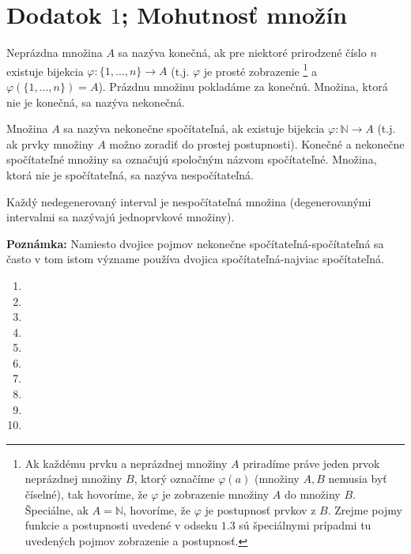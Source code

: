 \chapter{Dodatok $1$; Mohutnosť množín}

Neprázdna množina $A$ sa nazýva konečná, ak pre niektoré prirodzené číslo $n$ existuje bijekcia $\varphi:\{1,...,n\}\rightarrow A$ (t.j. $\varphi$ je prosté zobrazenie \footnote{Ak každému prvku a neprázdnej množiny $A$ priradíme práve jeden prvok neprázdnej množiny $B$, ktorý označíme $\varphi (a)$ (množiny $A,B$ nemusia byť číselné), tak hovoríme, že $\varphi$ je zobrazenie množiny $A$ do množiny $B$. Špeciálne, ak $A=\mathbb{N}$, hovoríme, že $\varphi$ je postupnosť prvkov z $B$. Zrejme pojmy funkcie a postupnosti uvedené v odseku $1.3$ sú špeciálnymi prípadmi tu uvedených pojmov zobrazenie a postupnosť.} a $\varphi(\{1,...,n\})=A$). Prázdnu množinu pokladáme za konečnú. Množina, ktorá nie je konečná, sa nazýva nekonečná.

Množina $A$ sa nazýva nekonečne spočítateľná, ak existuje bijekcia $\varphi:\mathbb{N}\rightarrow A$ (t.j. ak prvky množiny $A$ možno zoradiť do prostej postupnosti). Konečné a nekonečne spočítateľné množiny sa označujú spoločným názvom spočítateľné. Množina, ktorá nie je spočítateľná, sa nazýva nespočítateľná.

\begin{veta}
Každý nedegenerovaný interval je nespočítateľná množina (degenerovanými intervalmi sa nazývajú jednoprvkové množiny).
\end{veta}

\textbf{Poznámka:} Namiesto dvojice pojmov nekonečne spočítateľná-spočítateľná sa často v tom istom význame používa dvojica spočítateľná-najviac spočítateľná.

\begin{enumerate}[resume]
  \item {}
  \item {}
  \item {}
  \item {}
  \item {}
  \item {}
  \item {}
  \item {}
  \item {}
  \item {}
\end{enumerate}